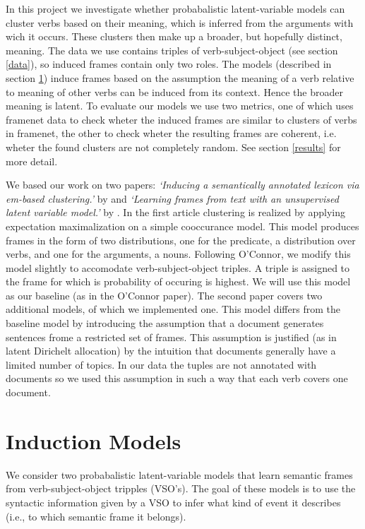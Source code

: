 \documentclass{article} %
\begin{document}
In this project we investigate whether probabalistic latent-variable models can cluster verbs based on their meaning, which is inferred from the arguments with wich it occurs. These clusters then make up a broader, but hopefully distinct, meaning. The data we use contains triples of verb-subject-object (see section \ref{data}), so induced frames contain only two roles. The models (described in section \ref{models}) induce frames based on the assumption the meaning of a verb relative to meaning of other verbs can be induced from its context. Hence the broader meaning is latent. To evaluate our models we use two metrics, one of which uses framenet data to check wheter the induced frames are similar to clusters of verbs in framenet, the other to check wheter the resulting frames are coherent, i.e. wheter the found clusters are not completely random. See section \ref{results} for more detail.

We based our work on two papers: \textit{`Inducing a semantically annotated lexicon via em-based clustering.'} by \citeauthor{rooth1999} and \textit{`Learning frames from text with an unsupervised latent variable model.'} by \citeauthor{oconnor2013}. In the first article clustering is realized by applying expectation maximalization on a simple cooccurance model. This model produces frames in the form of two distributions, one for the predicate, a distribution over verbs, and one for the arguments, a nouns. Following O'Connor, we modify this model slightly to accomodate verb-subject-object triples. A triple is assigned to the frame for which is probability of occuring is highest. We will use this model as our baseline (as in the O'Connor paper). The second paper covers two additional models, of which we implemented one. This model differs from the baseline model by introducing the assumption that a document generates sentences frome a restricted set of frames. This assumption is justified (as in latent Dirichelt allocation) \cite{blei2003} by the intuition that documents generally have a limited number of topics. In our data the tuples are not annotated with documents so we used this assumption in such a way that each verb covers one document.  


\section{Induction Models}
\label{models}
We consider two probabalistic latent-variable models that learn semantic frames
from verb-subject-object tripples (VSO's).
The goal of these models is to use the syntactic information given by a VSO to
infer what kind of event it describes (i.e., to which semantic frame it belongs).
\end{document}

